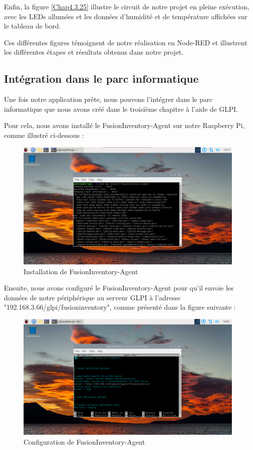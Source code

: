 Enfin, la figure \ref{Chap4.3.25} illustre le circuit de notre projet en pleine exécution, avec les LEDs allumées et les données d'humidité et de température affichées sur le tableau de bord.

Ces différentes figures témoignent de notre réalisation en Node-RED et illustrent les différentes étapes et résultats obtenus dans notre projet.


\subsection{Intégration dans le parc informatique}

Une fois notre application prête, nous pouvons l'intégrer dans le parc informatique que nous avons créé dans le troisième chapitre à l'aide de GLPI.

Pour cela, nous avons installé le FusionInventory-Agent sur notre Raspberry Pi, comme illustré ci-dessous :

\begin{figure}[H]
\centering
\includegraphics[width=15cm]{Images/raspberryfusion.png}
\caption{Installation de FusionInventory-Agent}
\label{fig:raspberry-fusion}
\end{figure}

Ensuite, nous avons configuré le FusionInventory-Agent pour qu'il envoie les données de notre périphérique au serveur GLPI à l'adresse "192.168.3.66/glpi/fusioninventory", comme présenté dans la figure suivante :

\begin{figure}[H]
\centering
\includegraphics[width=15cm]{Images/raspberryfusion1.png}
\caption{Configuration de FusionInventory-Agent}
\label{fig:raspberry-fusion-config}
\end{figure}

